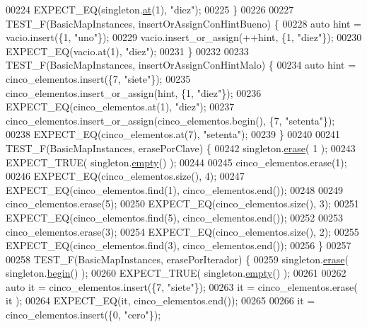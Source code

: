 \begin{DoxyCode}
00224     EXPECT\_EQ(singleton.\hyperlink{classaed2_1_1map_a0b0a11f906da2926f9eb342fcee79fd7_a0b0a11f906da2926f9eb342fcee79fd7}{at}(1), \textcolor{stringliteral}{"diez"});
00225 \}
00226 
00227 TEST\_F(BasicMapInstances, insertOrAssignConHintBueno) \{
00228     \textcolor{keyword}{auto} hint = vacio.insert(\{1, \textcolor{stringliteral}{"uno"}\});
00229     vacio.insert\_or\_assign(++hint, \{1, \textcolor{stringliteral}{"diez"}\});
00230     EXPECT\_EQ(vacio.at(1), \textcolor{stringliteral}{"diez"});
00231 \}
00232 
00233 TEST\_F(BasicMapInstances, insertOrAssignConHintMalo) \{
00234     \textcolor{keyword}{auto} hint = cinco\_elementos.insert(\{7, \textcolor{stringliteral}{"siete"}\});
00235     cinco\_elementos.insert\_or\_assign(hint, \{1, \textcolor{stringliteral}{"diez"}\});
00236     EXPECT\_EQ(cinco\_elementos.at(1), \textcolor{stringliteral}{"diez"});
00237     cinco\_elementos.insert\_or\_assign(cinco\_elementos.begin(), \{7, \textcolor{stringliteral}{"setenta"}\});
00238     EXPECT\_EQ(cinco\_elementos.at(7), \textcolor{stringliteral}{"setenta"});
00239 \}
00240 
00241 TEST\_F(BasicMapInstances, erasePorClave) \{
00242     singleton.\hyperlink{classaed2_1_1map_ad8e796bf9c9c558e5ce6b61e116253fe_ad8e796bf9c9c558e5ce6b61e116253fe}{erase}( 1 );
00243     EXPECT\_TRUE( singleton.\hyperlink{classaed2_1_1map_af5320ca0a7df4d16015441d5d055a7ee_af5320ca0a7df4d16015441d5d055a7ee}{empty}() );
00244 
00245     cinco\_elementos.erase(1);
00246     EXPECT\_EQ(cinco\_elementos.size(), 4);
00247     EXPECT\_EQ(cinco\_elementos.find(1), cinco\_elementos.end());
00248 
00249     cinco\_elementos.erase(5);
00250     EXPECT\_EQ(cinco\_elementos.size(), 3);
00251     EXPECT\_EQ(cinco\_elementos.find(5), cinco\_elementos.end());
00252 
00253     cinco\_elementos.erase(3);
00254     EXPECT\_EQ(cinco\_elementos.size(), 2);
00255     EXPECT\_EQ(cinco\_elementos.find(3), cinco\_elementos.end());
00256 \}
00257 
00258 TEST\_F(BasicMapInstances, erasePorIterador) \{
00259     singleton.\hyperlink{classaed2_1_1map_ad8e796bf9c9c558e5ce6b61e116253fe_ad8e796bf9c9c558e5ce6b61e116253fe}{erase}( singleton.\hyperlink{classaed2_1_1map_a58a95705d54b3dda7f775ce5a22225cb_a58a95705d54b3dda7f775ce5a22225cb}{begin}() );
00260     EXPECT\_TRUE( singleton.\hyperlink{classaed2_1_1map_af5320ca0a7df4d16015441d5d055a7ee_af5320ca0a7df4d16015441d5d055a7ee}{empty}() );
00261 
00262     \textcolor{keyword}{auto} it = cinco\_elementos.insert(\{7, \textcolor{stringliteral}{"siete"}\});
00263     it = cinco\_elementos.erase( it );
00264     EXPECT\_EQ(it, cinco\_elementos.end());
00265 
00266     it = cinco\_elementos.insert(\{0, \textcolor{stringliteral}{"cero"}\});

\end{DoxyCode}
